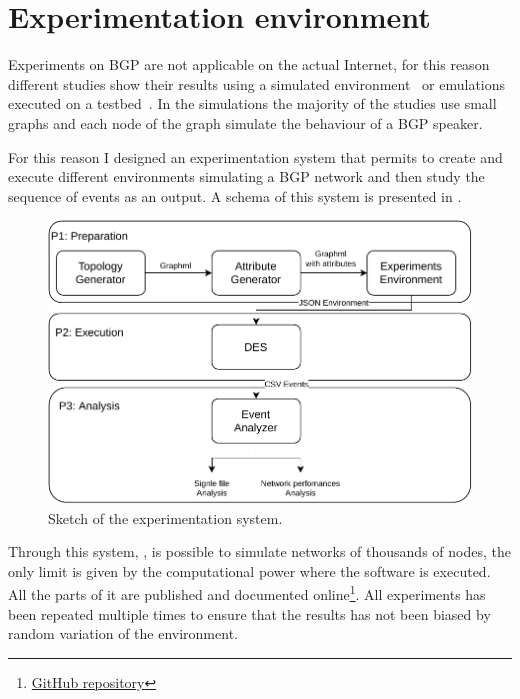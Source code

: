 \chapter{Experimentation environment}
\label{cha:des}

Experiments on \ac{BGP} are not  applicable on the actual Internet, for this
reason different studies show their results using a simulated environment~\cite{griffin2001experimental}
or emulations executed on a testbed~\cite{milani2020improving}.
In the simulations the majority of the studies use small graphs and each node
of the graph simulate the behaviour of a \ac{BGP} speaker.

For this reason I designed an experimentation system that permits to create and execute
different environments simulating a \ac{BGP} network and then study the sequence
of events as an output.
A schema of this system is presented in .

\begin{figure}[ht]
    \centering
    \includegraphics[scale=0.75]{images/toolchain.pdf}
    \caption{Sketch of the experimentation system.}
    \label{fig:exp_sketch}
\end{figure}

Through this system, , is possible to simulate networks
of thousands of nodes, the only limit is given by the computational power where
the software is executed.
All the parts of it are published and documented
online\footnote{\href{https://github.com/tiamilani/BGPFSM}{GitHub repository}}.
All experiments has been repeated multiple times to ensure that the results
has not been biased by random variation of the environment.

